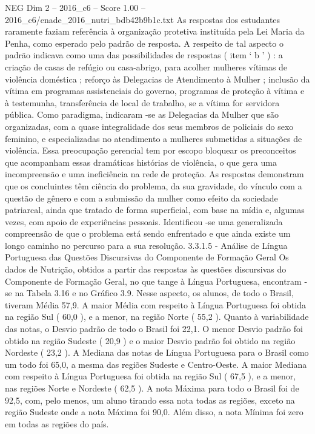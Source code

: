 \begin{textsample}{NEG Dim 2 – 2016\_c6 – Score 1.00 – 2016\_c6/enade\_2016\_nutri\_bdb42b9b1c.txt}
As respostas dos estudantes raramente faziam referência à organização protetiva instituída pela Lei Maria da Penha, como esperado pelo padrão de resposta.
A respeito de tal aspecto o padrão indicava como uma das possibilidades de respostas ( item ‘ b ’ ) : a criação de casas de refúgio ou casa-abrigo, para acolher mulheres vítimas de violência doméstica ; reforço às Delegacias de Atendimento à Mulher ; inclusão da vítima em programas assistenciais do governo, programas de proteção à vítima e à testemunha, transferência de local de trabalho, se a vítima for servidora pública.
Como paradigma, indicaram -se as Delegacias da Mulher que são organizadas, com a quase integralidade dos seus membros de policiais do sexo feminino, e especializadas no atendimento a mulheres submetidas a situações de violência.
Essa preocupação gerencial tem por escopo bloquear os preconceitos que acompanham essas dramáticas histórias de violência, o que gera uma incompreensão e uma ineficiência na rede de proteção.
As respostas demonstram que os concluintes têm ciência do problema, da sua gravidade, do vínculo com a questão de gênero e com a submissão da mulher como efeito da sociedade patriarcal, ainda que tratado de forma superficial, com base na mídia e, algumas vezes, com apoio de experiências pessoais.
Identificou -se uma generalizada compreensão de que o problema está sendo enfrentado e que ainda existe um longo caminho no percurso para a sua resolução. 3.3.1.5 - Análise de Língua Portuguesa das Questões Discursivas do Componente de Formação Geral Os dados de Nutrição, obtidos a partir das respostas às questões discursivas do Componente de Formação Geral, no que tange à Língua Portuguesa, encontram -se na Tabela 3.16 e no Gráfico 3.9.
Nesse aspecto, os alunos, de todo o Brasil, tiveram Média 57,9.
A maior Média com respeito à Língua Portuguesa foi obtida na região Sul ( 60,0 ), e a menor, na região Norte ( 55,2 ).
Quanto à variabilidade das notas, o Desvio padrão de todo o Brasil foi 22,1.
O menor Desvio padrão foi obtido na região Sudeste ( 20,9 ) e o maior Desvio padrão foi obtido na região Nordeste ( 23,2 ).
A Mediana das notas de Língua Portuguesa para o Brasil como um todo foi 65,0, a mesma das regiões Sudeste e Centro-Oeste.
A maior Mediana com respeito à Língua Portuguesa foi obtida na região Sul ( 67,5 ), e a menor, nas regiões Norte e Nordeste ( 62,5 ).
A nota Máxima para todo o Brasil foi de 92,5, com, pelo menos, um aluno tirando essa nota todas as regiões, exceto na região Sudeste onde a nota Máxima foi 90,0.
Além disso, a nota Mínima foi zero em todas as regiões do país.

\end{textsample}
